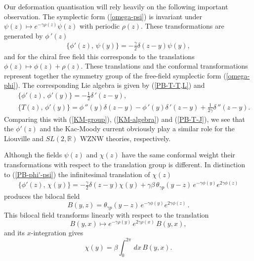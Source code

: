\documentclass[a4paper,12pt]{article}
\newcommand{\rr}{\mathbb{R}}
\begin{document}
\noindent
Our deformation quantisation will rely heavily on the following
important observation.  The symplectic form (\ref{omega-psi}) is
invariant under $\psi(z)\mapsto e^{-\gamma\rho(z)}\psi(z)$ with
periodic $\rho(z)$.  These transformations are generated by
$\phi\,'(z)$
\begin{eqnarray}\label{PB-phi'-psi}
\{\phi'(z),\, \psi(y)\}=-\frac{\gamma}{2}\delta(z-y)\psi(y),
\end{eqnarray}
and for the chiral free field this corresponds to the
translations $\phi(z)\mapsto \phi(z)+\rho(z)$. These
translations and the conformal transformations represent together
the symmetry
group of the free-field symplectic form (\ref{omega-phi}). The
corresponding Lie algebra is given by (\ref{PB-T-T,L}) and
\begin{eqnarray}\label{PB-phi'-phi'}
&&\{\phi'(z),\, \phi'(y)\}=-\frac{1}{2}\delta\,'(z-y),\\
\label{PB-T-phi'}
&&\{ T (z),\, \phi' (y)\}= \phi\,'' (y)\delta(z-y)-
\phi\,' (y)\delta\,'(z-y)+\frac{1}{2\gamma}\delta\,''(z-y).
\end{eqnarray}
Comparing this with (\ref{KM-group}), (\ref{KM-algebra}) and
(\ref{PB-T-J}), we see that the $\phi'(z)$ and the Kac-Moody current
obviously play a similar role for the Liouville and $SL(2,\rr)$ WZNW
theories, respectively.

\noindent
Although the fields $\psi(z)$ and $\chi(z)$ have the same conformal
weight their transformations with respect to the translation group is
different. In distinction to
(\ref{PB-phi'-psi}) the infinitesimal translation of $\chi(z)$
\begin{eqnarray}\label{PB-phi'-chi}
\{\phi'(z),\, \chi(y)\}=-\frac{\gamma}{2}\delta(z-y)\chi(y)+
\gamma\beta\, \theta_{\gamma p}(y-z)\,e^{-\gamma\phi(y)}e^{2\gamma\phi(z)}
\end{eqnarray}
produces the  bilocal field
\begin{equation}\label{bilocal}
B(y,z)=\theta_{\gamma p}(y-z)\,e^{-\gamma\phi(y)}e^{2\gamma\phi(z)}\,.
\end{equation}
This bilocal field transforms linearly with respect to the translation
\begin{equation}\label{bilocal1}
B(y,x)\mapsto e^{-\gamma\rho(y)}\,e^{2\gamma\rho(x)}\,B(y,x),
\end{equation}
and its $x$-integration gives
\begin{equation}\label{B-chi}
\chi (y)=\beta\int_0^{2\pi}\,dx\, B(y,x).
\end{equation}
\end{document}
